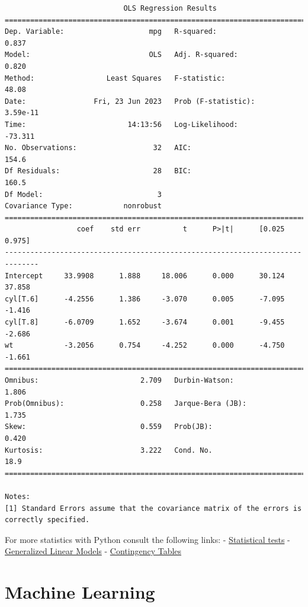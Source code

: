 \documentclass[
  letterpaper,
  DIV=11,
  numbers=noendperiod]{scrreprt}
\begin{document}
\begin{verbatim}
                            OLS Regression Results                            
==============================================================================
Dep. Variable:                    mpg   R-squared:                       0.837
Model:                            OLS   Adj. R-squared:                  0.820
Method:                 Least Squares   F-statistic:                     48.08
Date:                Fri, 23 Jun 2023   Prob (F-statistic):           3.59e-11
Time:                        14:13:56   Log-Likelihood:                -73.311
No. Observations:                  32   AIC:                             154.6
Df Residuals:                      28   BIC:                             160.5
Df Model:                           3                                         
Covariance Type:            nonrobust                                         
==============================================================================
                 coef    std err          t      P>|t|      [0.025      0.975]
------------------------------------------------------------------------------
Intercept     33.9908      1.888     18.006      0.000      30.124      37.858
cyl[T.6]      -4.2556      1.386     -3.070      0.005      -7.095      -1.416
cyl[T.8]      -6.0709      1.652     -3.674      0.001      -9.455      -2.686
wt            -3.2056      0.754     -4.252      0.000      -4.750      -1.661
==============================================================================
Omnibus:                        2.709   Durbin-Watson:                   1.806
Prob(Omnibus):                  0.258   Jarque-Bera (JB):                1.735
Skew:                           0.559   Prob(JB):                        0.420
Kurtosis:                       3.222   Cond. No.                         18.9
==============================================================================

Notes:
[1] Standard Errors assume that the covariance matrix of the errors is correctly specified.
\end{verbatim}

For more statistics with Python consult the following links: -
\href{https://www.statsmodels.org/stable/stats.html}{Statistical tests}
- \href{https://www.statsmodels.org/stable/glm.html}{Generalized Linear
Models} -
\href{https://www.statsmodels.org/stable/contingency_tables.html}{Contingency
Tables}

\hypertarget{machine-learning}{%
\section*{Machine Learning}\label{machine-learning}}
\end{document}
